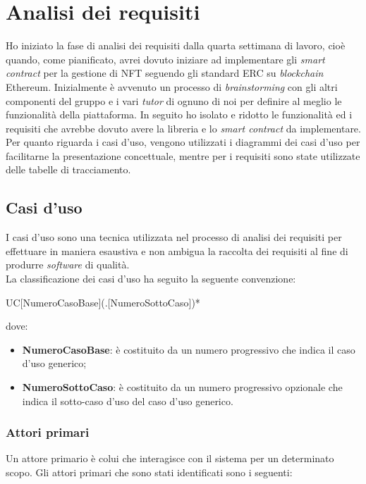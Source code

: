 
\section{Analisi dei requisiti}
Ho iniziato la fase di analisi dei requisiti dalla quarta settimana di lavoro, cioè quando, come pianificato, avrei dovuto iniziare ad implementare gli \textit{smart contract} per la gestione di NFT seguendo gli standard ERC su \textit{blockchain} Ethereum. Inizialmente è avvenuto un processo di \textit{brainstorming} con gli altri componenti del gruppo e i vari \textit{tutor} di ognuno di noi per definire al meglio le funzionalità della piattaforma. In seguito ho isolato e ridotto le funzionalità ed i requisiti che avrebbe dovuto avere la libreria e lo \textit{smart contract} da implementare. Per quanto riguarda i casi d'uso, vengono utilizzati i diagrammi dei casi d'uso per facilitarne la presentazione concettuale, mentre per i requisiti sono state utilizzate delle tabelle di tracciamento. 

\subsection{Casi d'uso}
I casi d'uso sono una tecnica utilizzata nel processo di analisi dei requisiti per effettuare in maniera esaustiva e non ambigua la raccolta dei requisiti al fine di produrre \textit{software} di qualità. \\

\noindent La classificazione dei casi d'uso ha seguito la seguente convenzione:
\begin{center}
  UC[NumeroCasoBase](.[NumeroSottoCaso])*
\end{center}
dove:
\begin{itemize}
  \item \textbf{NumeroCasoBase}: è costituito da un numero progressivo che indica il caso d'uso generico;
  \item \textbf{NumeroSottoCaso}: è costituito da un numero progressivo opzionale che indica il sotto-caso d'uso del caso
  d'uso generico.
\end{itemize}

\subsubsection{Attori primari}
Un attore primario è colui che interagisce con il sistema per un determinato scopo.
Gli attori primari che sono stati identificati sono i seguenti:

